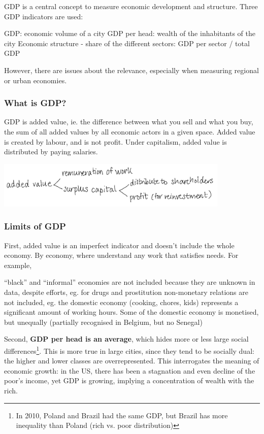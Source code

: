 \documentclass{article}
\begin{document}
GDP is a central concept to measure economic development and structure. 
Three GDP indicators are used:

\begin{outline}
	\1 GDP: economic volume of a city
	\1 GDP per head: wealth of the inhabitants of the city
	\1 Economic structure - share of the different sectors: GDP per sector / total GDP
\end{outline}

However, there are issues about the relevance, especially when measuring regional or urban economies.

\subsubsection{What is GDP?}

GDP is added value, ie. the difference between what you sell and what you buy, the sum of all added values by all economic actors in a given space. 
Added value is created by labour, and is not profit. Under capitalism, added value is distributed by paying salaries.

\begin{center}
\includegraphics[width=30em]{added_value}
\end{center}

\subsubsection{Limits of GDP}

First, added value is an imperfect indicator and doesn't include the whole economy. By economy, where understand any work that satisfies needs. For example,
\begin{outline}
	\1  ``black'' and ``informal'' economies are not included because they are unknown in data, despite efforts, eg. for drugs and prostitution
	\1 non-monetary relations are not included, eg. the domestic economy (cooking, chores, kids) represents a significant amount of working hours. Some of the domestic economy is monetised, but unequally (partially recognised in Belgium, but no Senegal)
\end{outline}

Second, \textbf{GDP per head is an average}, which hides more or less large social differences\footnote{In 2010, Poland and Brazil had the same GDP, but Brazil has more inequality than Poland (rich vs. poor distribution)}. This is more true in large cities, since they tend to be socially dual: the higher and lower classes are overrepresented. 
This interrogates the meaning of economic growth: in the US, there has been a stagnation and even decline of the poor's income, yet GDP is growing, implying a concentration of wealth with the rich. 
\end{document}
